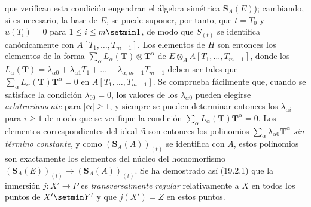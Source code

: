 
que verifican esta condición engendran el álgebra simétrica $\mathbf S_A(E)$); cambiando, si es necesario, la base de $E$, se puede suponer, por tanto, que $t=T_0$ y $u(T_i)=0$ para $1\leq i\leq m\setmin 1$, de modo que $S_{(t)}$ se identifica canónicamente con $A[T_1,\ldots,T_{m-1}]$. Los elementos de $H$ son entonces los elementos de la forma
$\sum_\alpha L_\alpha(\mathbf T)\otimes\mathbf T^\alpha$
de $E\otimes_A A[T_1,\ldots,T_{m-1}]$, donde los $L_\alpha(\mathbf T)=\lambda_{\alpha0}+\lambda_{\alpha1}T_1+\ldots+\lambda_{\alpha,m-1}T_{m-1}$ deben ser tales que $\sum_\alpha L_\alpha(\mathbf T)\mathbf T^\alpha=0$ en $A[T_1,\ldots,T_{m-1}]$. Se comprueba fácilmente que, cuando se satisface la condición $\lambda_{00}=0$, los valores de los $\lambda_{\alpha0}$ pueden elegirse \emph{arbitrariamente} para $|\boldsymbol{\alpha}|\geq1$, y siempre se pueden determinar entonces los $\lambda_{\alpha i}$ para $i\geq1$ de modo que se verifique la condición $\sum_\alpha L_\alpha(\mathbf T)\mathbf T^\alpha=0$. Los elementos correspondientes del ideal $\mathfrak K$ son entonces los polinomios $\sum_\alpha\lambda_{\alpha0}\mathbf T^\alpha$ \emph{sin término constante}, y como $(\mathbf S_A(A))_{(t)}$ se identifica con $A$, estos polinomios son exactamente los elementos del núcleo del homomorfismo $(\mathbf S_A(E))_{(t)}\to(\mathbf S_A(A))_{(t)}$. Se ha demostrado así (19.2.1) que la inmersión $j:X'\to P$ es \emph{transversalmente regular} relativamente a $X$ en todos los puntos de $X'\setmin Y'$ y que $j(X')=Z$ en estos puntos.

